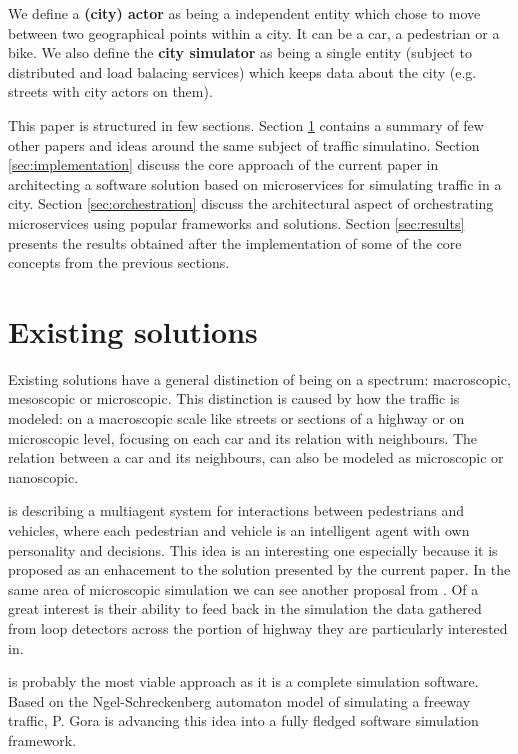 \documentclass[conference]{IEEEtran}
\begin{document}
We define a \textbf{(city) actor} as being a independent entity which chose to move between two geographical points within a city. It can be a car, a pedestrian or a bike. We also define the \textbf{city simulator} as being a single entity (subject to distributed and load balacing services) which keeps data about the city (e.g. streets with city actors on them).

This paper is structured in few sections. Section \ref{sec:existingsolutions} contains a summary of few other papers and ideas around the same subject of traffic simulatino. Section \ref{sec:implementation} discuss the core approach of the current paper in architecting a software solution based on microservices for simulating traffic in a city. Section \ref{sec:orchestration} discuss the architectural aspect of orchestrating microservices using popular frameworks and solutions. Section \ref{sec:results} presents the results obtained after the implementation of some of the core concepts from the previous sections.

\section{Existing solutions}
\label{sec:existingsolutions}

Existing solutions have a general distinction of being on a spectrum: macroscopic, mesoscopic or microscopic. This distinction is caused by how the traffic is modeled: on a macroscopic scale like streets or sections of a highway or on microscopic level, focusing on each car and its relation with neighbours. The relation between a car and its neighbours, can also be modeled as microscopic or nanoscopic.

\cite{6973934} is describing a multiagent system for interactions between pedestrians and vehicles, where each pedestrian and vehicle is an intelligent agent with own personality and decisions. This idea is an interesting one especially because it is proposed as an enhacement to the solution presented by the current paper. In the same area of microscopic simulation we can see another proposal from \cite{7004985}. Of a great interest is their ability to feed back in the simulation the data gathered from loop detectors across the portion of highway they are particularly interested in.

\cite{6205472} is probably the most viable approach as it is a complete simulation software. Based on the Ngel-Schreckenberg \citep{nagel-schreckenberg} automaton model of simulating a freeway traffic, P. Gora is advancing this idea into a fully fledged software simulation framework.
\end{document}
